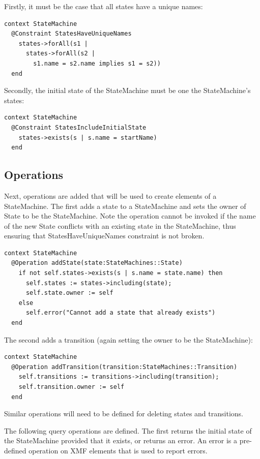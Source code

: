 \noindent Firstly, it must be the case that all states have a
unique names:

\begin{lstlisting}
context StateMachine
  @Constraint StatesHaveUniqueNames
    states->forAll(s1 |
      states->forAll(s2 |
        s1.name = s2.name implies s1 = s2))
  end
\end{lstlisting}\noindent Secondly, the initial state of the StateMachine must be
one the StateMachine's states:

\begin{lstlisting}
context StateMachine
  @Constraint StatesIncludeInitialState
    states->exists(s | s.name = startName)
  end
\end{lstlisting}\subsection{Operations}

Next, operations are added that will be used to create elements of
a StateMachine. The first adds a state to a StateMachine and sets
the owner of State to be the StateMachine. Note the operation
cannot be invoked if the name of the new State conflicts with an
existing state in the StateMachine, thus ensuring that
StatesHaveUniqueNames constraint is not broken.

\begin{lstlisting}
context StateMachine
  @Operation addState(state:StateMachines::State)
    if not self.states->exists(s | s.name = state.name) then
      self.states := states->including(state);
      self.state.owner := self
    else
      self.error("Cannot add a state that already exists")
  end
\end{lstlisting}\noindent The second adds a transition (again setting the owner to
be the StateMachine):


\begin{lstlisting}
context StateMachine
  @Operation addTransition(transition:StateMachines::Transition)
    self.transitions := transitions->including(transition);
    self.transition.owner := self
  end
\end{lstlisting}\noindent Similar operations will need to be defined for deleting
states and transitions.

The following query operations are defined. The first returns the
initial state of the StateMachine provided that it exists, or
returns an error. An error is a pre-defined operation on XMF
elements that is used to report errors.

